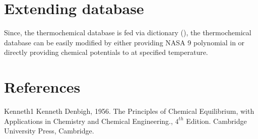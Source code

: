 \documentclass[letterpaper,10pt,english]{sphinxmanual}
\begin{document}
\chapter{Extending database}
\label{\detokenize{extending_database:extending-database}}\label{\detokenize{extending_database::doc}}
Since, the thermochemical database is fed via dictionary (), the thermochemical database can be easily modified by either providing NASA 9 polynomial in  or directly providing chemical potentials to  at specified temperature.

\begin{sphinxVerbatim}[commandchars=\\\{\},numbers=left,firstnumber=1,stepnumber=1]
   
    
\end{sphinxVerbatim}


\chapter{References}
\label{\detokenize{extending_database:references}}
\begin{sphinxthebibliography}{Kenneth1}
Kenneth Denbigh, 1956. The Principles of Chemical Equilibrium, with Applications in Chemistry and Chemical Engineering., \(4^{th}\) Edition. Cambridge University Press, Cambridge.
\end{sphinxthebibliography}



\renewcommand{\indexname}{Index}
\printindex
\end{document}
